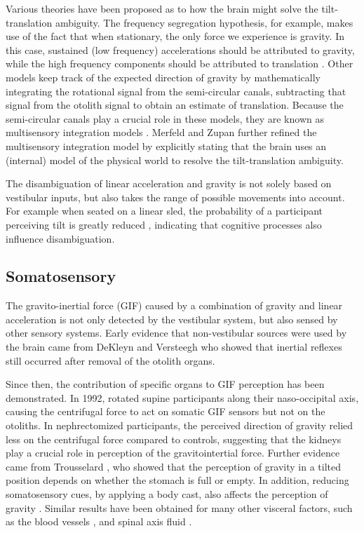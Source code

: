 Various theories have been proposed as to how the brain might solve the tilt-translation ambiguity. The frequency segregation hypothesis, for example, makes use of the fact that when stationary, the only force we experience is gravity. In this case, sustained (low frequency) accelerations should be  attributed to gravity, while the high frequency components should be attributed to translation \cite{paige1991, telford1997}. Other models keep track of the expected direction of gravity by mathematically integrating the rotational signal from the semi-circular canals, subtracting that signal from the otolith signal to obtain an estimate of translation. Because the semi-circular canals play a  crucial role in these models, they are known as multisensory integration models \cite{mayne1974,ormsby1977}. Merfeld and Zupan \citeyear{merfeld1995,merfeld2002} further refined the multisensory integration model by explicitly stating that the brain uses an (internal) model of the physical world to resolve the tilt-translation ambiguity.

The disambiguation of linear acceleration and gravity is not solely based on vestibular inputs, but also takes the  range of  possible movements into account. For example when seated on a linear sled, the probability of a participant perceiving tilt is greatly reduced \cite{wertheim2001}, indicating that cognitive processes also influence disambiguation.


\subsection{Somatosensory}
The gravito-inertial force (GIF) caused by a combination of gravity and linear acceleration is not only detected by the vestibular system, but also sensed by other sensory systems. Early evidence that non-vestibular sources were used by the brain came from DeKleyn and Versteegh \citeyear{dekleyn1933} who showed that inertial reflexes still occurred after removal of the otolith organs.

Since then, the contribution of specific organs to GIF perception has been demonstrated. In 1992, \citeauthor{mittelstaedt1992} rotated supine participants along  their naso-occipital axis,  causing  the centrifugal force to act on somatic GIF sensors  but not on the otoliths. In nephrectomized participants, the perceived direction of gravity relied less on the centrifugal force compared to controls, suggesting that the kidneys play a crucial role in perception of the gravitointertial force. Further evidence came from Trousselard \citeyear{trousselard2004}, who showed that the perception of gravity in a tilted position depends on whether the stomach is full or empty. In addition, reducing somatosensory cues, by applying a body cast, also affects the perception of gravity \cite{trousselard2004}.  Similar results have been obtained for many other visceral factors, such as the blood vessels \cite{vaitl2002}, and spinal axis fluid \cite{vaitl1997}.


